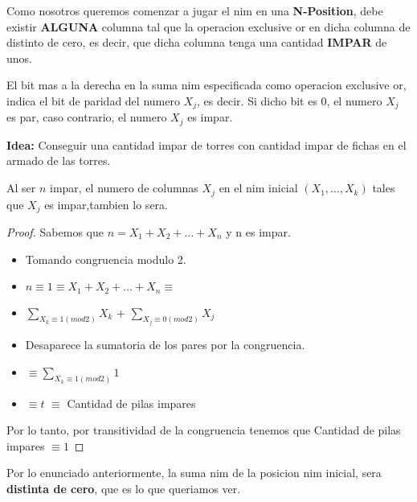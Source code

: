 \begin{corollary}
	Como nosotros queremos comenzar a jugar el nim en una \textbf{N-Position}, debe existir \textbf{ALGUNA} columna tal que la operacion exclusive or en dicha columna de distinto de cero, es decir, que dicha columna tenga una cantidad \textbf{IMPAR} de unos.
\end{corollary}

\begin{lemma}
	El bit mas a la derecha en la suma nim especificada como operacion exclusive or, indica el bit de paridad del numero $X_j$, es decir. Si dicho bit es 0, el numero $X_j$ es par, caso contrario, el numero $X_j$ es impar.
\end{lemma}

\textbf{Idea:} Conseguir una cantidad impar de torres con cantidad impar de fichas en el armado de las torres.\\

\begin{theorem}[]
	Al ser $n$ impar, el numero de columnas $X_j$ en el nim inicial $(X_1, \dots, X_k)$ tales que $X_j$ es impar,tambien lo sera.
\end{theorem}

\begin{proof}

Sabemos que $n = X_1 + X_2 + \dots + X_n $ y n es impar.

\begin{itemize}
	\item[] Tomando congruencia modulo 2.
	\item[] $n \equiv 1 \equiv X_1 + X_2 + \dots + X_n \equiv $
	\item[] $\sum\limits_{X_k \equiv 1( mod 2 )} X_k$ + $\sum\limits_{X_j \equiv 0( mod 2 )} X_j$
	\item[] Desaparece la sumatoria de los pares por la congruencia.
	\item[] $\equiv \sum\limits_{X_k \equiv 1( mod 2 )} 1$
	\item[] $\equiv t$ $ \equiv $ {Cantidad de pilas impares} 
\end{itemize}

Por lo tanto, por transitividad de la congruencia tenemos que {Cantidad de pilas impares} $\equiv 1$
\end{proof}

Por lo enunciado anteriormente, la suma nim de la posicion nim inicial, sera \textbf{distinta de cero}, que es lo que queriamos ver.